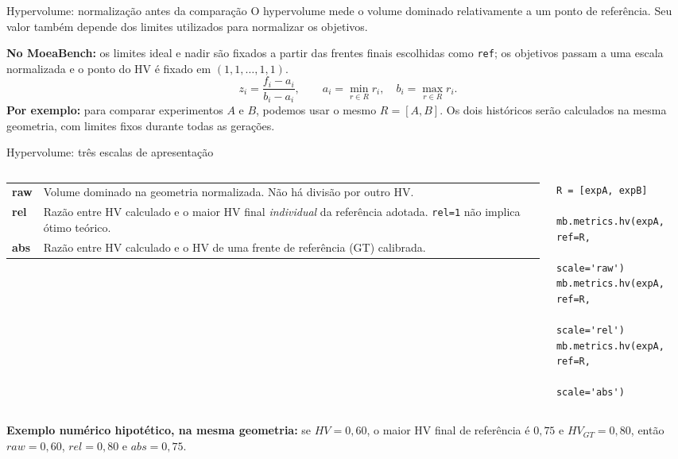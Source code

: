 \begin{frame}{Hypervolume: normalização antes da comparação}
O hypervolume mede o volume dominado relativamente a um ponto de referência. Seu valor também depende dos limites utilizados para normalizar os objetivos.
\par\medskip
\textbf{No MoeaBench:} os limites ideal e nadir são fixados a partir das frentes finais escolhidas como \texttt{ref}; os objetivos passam a uma escala normalizada e o ponto do HV é fixado em $(1{,}1,\ldots,1{,}1)$.
\[
z_i=\frac{f_i-a_i}{b_i-a_i},\qquad a_i=\min_{r\in R}r_i,\quad b_i=\max_{r\in R}r_i.
\]
\textbf{Por exemplo:} para comparar experimentos $A$ e $B$, podemos usar o mesmo $R=[A,B]$. Os dois históricos serão calculados na mesma geometria, com limites fixos durante todas as gerações.
\end{frame}

\begin{frame}[fragile]{Hypervolume: três escalas de apresentação}
\begin{columns}[T,onlytextwidth]
\begin{column}{.52\textwidth}
\begin{tabularx}{\linewidth}{@{}>{\bfseries}p{.65cm}X@{}}
raw & Volume dominado na geometria normalizada. Não há divisão por outro HV.\\[5pt]
rel & Razão entre HV calculado e o maior HV final \emph{individual} da referência adotada. \texttt{rel=1} não implica ótimo teórico.\\[5pt]
abs & Razão entre HV calculado e o HV de uma frente de referência (GT) calibrada.\\
\end{tabularx}
\end{column}
\begin{column}{.46\textwidth}
\begin{lstlisting}[style=python,basicstyle=\ttfamily\fontsize{8}{10}\selectfont]
R = [expA, expB]

mb.metrics.hv(expA, ref=R,
              scale='raw')
mb.metrics.hv(expA, ref=R,
              scale='rel')
mb.metrics.hv(expA, ref=R,
              scale='abs')
\end{lstlisting}
\end{column}
\end{columns}
\vspace{.19cm}
\textbf{Exemplo numérico hipotético, na mesma geometria:} se $HV=0{,}60$, o maior HV final de referência é $0{,}75$ e $HV_{GT}=0{,}80$, então $raw=0{,}60$, $rel=0{,}80$ e $abs=0{,}75$.
\par{}
\end{frame}

